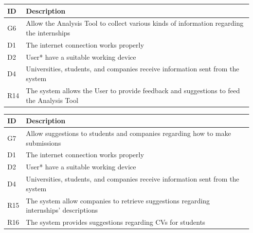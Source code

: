 \begin{center}
    \begin{longtable}{|l|p{13.5cm}|}
        \hline
        \rowcolor[HTML]{5C8A99}
        \textbf{ID} & \textbf{Description} \\ \hline
        \rowcolor[HTML]{E7E0FA} %
        G6 & Allow the Analysis Tool to collect various kinds of information regarding the internships \\ \hline
        \rowcolor[HTML]{FFF9C4} %
        D1 & The internet connection works properly \\ \hline
        \rowcolor[HTML]{FFF9C4} %
        D2 & User* have a suitable working device \\ \hline
        \rowcolor[HTML]{FFF9C4} %
        D4 & Universities, students, and companies receive information sent from the system \\ \hline
        \hline\rowcolor[HTML]{FFDAB9} %
        R14 & The system allows the User to provide feedback and suggestions to feed the Analysis Tool \\ \hline
    \end{longtable}
\end{center}

\begin{center}
    \begin{longtable}{|l|p{13.5cm}|}
        \hline
        \rowcolor[HTML]{5C8A99}
        \textbf{ID} & \textbf{Description} \\ \hline
        \rowcolor[HTML]{E7E0FA} %
        G7 & Allow suggestions to students and companies regarding how to make submissions \\ \hline
        \rowcolor[HTML]{FFF9C4} %
        D1 & The internet connection works properly \\ \hline
        \rowcolor[HTML]{FFF9C4} %
        D2 & User* have a suitable working device \\ \hline
        \rowcolor[HTML]{FFF9C4} %
        D4 & Universities, students, and companies receive information sent from the system \\ \hline
        \hline\rowcolor[HTML]{FFDAB9} %
        R15 &The system allow companies to retrieve suggestions regarding internships’ descriptions \\ \hline
        \hline\rowcolor[HTML]{FFDAB9} %
        R16 & The system provides suggestions regarding CVs for students \\ \hline
    \end{longtable}
\end{center}

